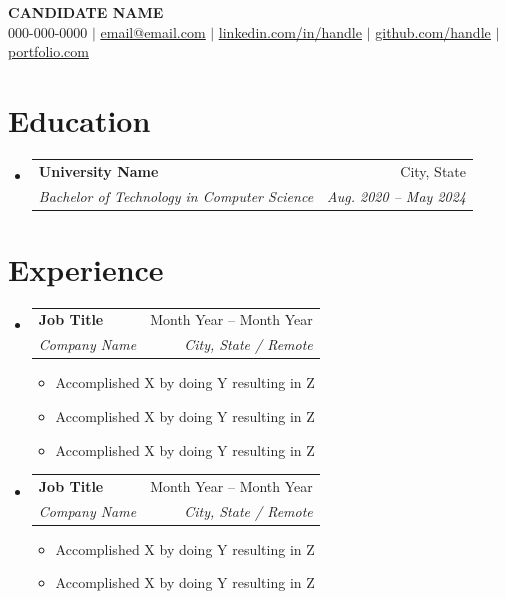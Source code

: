 \documentclass[letterpaper,11pt]{article}
\makeatletter
\newcommand{\resumeItem}[1]{
  \item\small{
    {#1 \vspace{-2pt}}
  }
}
\newcommand{\resumeSubheading}[4]{
  \vspace{-2pt}\item
    \begin{tabular*}{0.97\textwidth}[t]{l@{\extracolsep{\fill}}r}
      \textbf{#1} & #2 \\
      \textit{\small#3} & \textit{\small #4} \\
    \end{tabular*}\vspace{-7pt}
}
\newcommand{\resumeSubHeadingListStart}{\begin{itemize}[leftmargin=0.15in, label={}]}
\newcommand{\resumeSubHeadingListEnd}{\end{itemize}}
\newcommand{\resumeItemListStart}{\begin{itemize}}
\newcommand{\resumeItemListEnd}{\end{itemize}\vspace{-5pt}}
\makeatother
\begin{document}
\begin{center}
    \textbf{\Huge \scshape CANDIDATE NAME} \\ \vspace{1pt}
    \small 000-000-0000 $|$ \href{mailto:email@email.com}{\underline{email@email.com}} $|$
    \href{https://linkedin.com/in/...}{\underline{linkedin.com/in/handle}} $|$
    \href{https://github.com/...}{\underline{github.com/handle}} $|$
    \href{https://portfolio.com}{\underline{portfolio.com}}
\end{center}


\section{Education}
  \resumeSubHeadingListStart
    \resumeSubheading
      {University Name}{City, State}
      {Bachelor of Technology in Computer Science}{Aug. 2020 -- May 2024}
  \resumeSubHeadingListEnd

\section{Experience}
  \resumeSubHeadingListStart

    \resumeSubheading
      {Job Title}{Month Year -- Month Year}
      {Company Name}{City, State / Remote}
      \resumeItemListStart
        \resumeItem{Accomplished X by doing Y resulting in Z}
        \resumeItem{Accomplished X by doing Y resulting in Z}
        \resumeItem{Accomplished X by doing Y resulting in Z}
      \resumeItemListEnd

    \resumeSubheading
      {Job Title}{Month Year -- Month Year}
      {Company Name}{City, State / Remote}
      \resumeItemListStart
        \resumeItem{Accomplished X by doing Y resulting in Z}
        \resumeItem{Accomplished X by doing Y resulting in Z}
      \resumeItemListEnd

  \resumeSubHeadingListEnd
\end{document}
